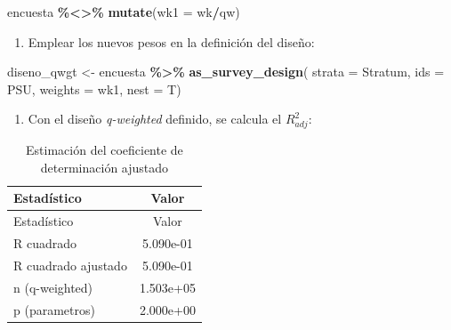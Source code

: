 \documentclass[
  spanish,
  12pt,
]{book}
\newenvironment{Shaded}{\begin{snugshade}}{\end{snugshade}}
\newcommand{\AttributeTok}[1]{\textcolor[rgb]{0.13,0.29,0.53}{#1}}
\newcommand{\DecValTok}[1]{\textcolor[rgb]{0.00,0.00,0.81}{#1}}
\newcommand{\FunctionTok}[1]{\textcolor[rgb]{0.13,0.29,0.53}{\textbf{#1}}}
\newcommand{\NormalTok}[1]{#1}
\newcommand{\OtherTok}[1]{\textcolor[rgb]{0.56,0.35,0.01}{#1}}
\newcommand{\SpecialCharTok}[1]{\textcolor[rgb]{0.81,0.36,0.00}{\textbf{#1}}}
\providecommand{\tightlist}{%
  \setlength{\itemsep}{0pt}\setlength{\parskip}{0pt}}
\begin{document}
\begin{Shaded}
\begin{Highlighting}[]
\NormalTok{encuesta }\SpecialCharTok{\%\textless{}\textgreater{}\%} \FunctionTok{mutate}\NormalTok{(}\AttributeTok{wk1 =}\NormalTok{ wk}\SpecialCharTok{/}\NormalTok{qw)}
\end{Highlighting}
\end{Shaded}

\begin{enumerate}
\def\labelenumi{\arabic{enumi}.}
\setcounter{enumi}{3}
\tightlist
\item
  Emplear los nuevos pesos en la definición del diseño:
\end{enumerate}

\begin{Shaded}
\begin{Highlighting}[]
\NormalTok{diseno\_qwgt }\OtherTok{\textless{}{-}}\NormalTok{ encuesta }\SpecialCharTok{\%\textgreater{}\%}
  \FunctionTok{as\_survey\_design}\NormalTok{(}
    \AttributeTok{strata =}\NormalTok{ Stratum,}
    \AttributeTok{ids =}\NormalTok{ PSU,}
    \AttributeTok{weights =}\NormalTok{ wk1,}
    \AttributeTok{nest =}\NormalTok{ T)}
\end{Highlighting}
\end{Shaded}

\begin{enumerate}
\def\labelenumi{\arabic{enumi}.}
\setcounter{enumi}{4}
\tightlist
\item
  Con el diseño \emph{q-weighted} definido, se calcula el \(R_{adj}^{2}\):
\end{enumerate}

\begin{Shaded}
\end{Shaded}

\begin{longtable}[]{@{}lc@{}}
\caption{\label{tab:tab-r2adj}Estimación del coeficiente de determinación ajustado}\tabularnewline
\toprule\noalign{}
Estadístico & Valor \\
\midrule\noalign{}
\endfirsthead
\toprule\noalign{}
Estadístico & Valor \\
\midrule\noalign{}
\endhead
\bottomrule\noalign{}
\endlastfoot
R cuadrado & 5.090e-01 \\
R cuadrado ajustado & 5.090e-01 \\
n (q-weighted) & 1.503e+05 \\
p (parametros) & 2.000e+00 \\
\end{longtable}
\end{document}

